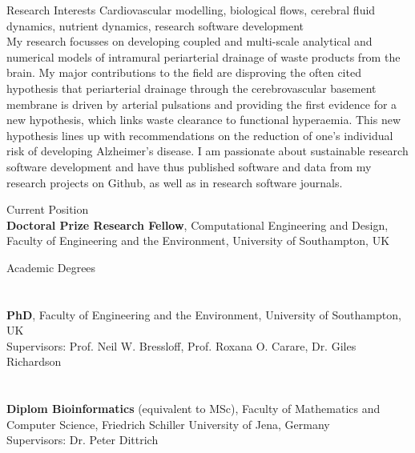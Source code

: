 \documentclass[margin,line,10pt]{res}
\begin{document}

\address{alexandra.diem@gmail.com, \url{https://www.akdiem.com}, \url{https://github.com/akdiem}}

\begin{resume}

{\sc Research Interests} Cardiovascular modelling, biological flows, cerebral fluid dynamics, nutrient dynamics, research software development\\

My research focusses on developing coupled and multi-scale analytical and numerical models of intramural periarterial drainage of waste products from the brain. My major contributions to the field are disproving the often cited hypothesis that periarterial drainage through the cerebrovascular basement membrane is driven by arterial pulsations and providing the first evidence for a new hypothesis, which links waste clearance to functional hyperaemia. This new hypothesis lines up with recommendations on the reduction of one's individual risk of developing Alzheimer's disease. I am passionate about sustainable research software development and have thus published software and data from my research projects on Github, as well as in research software journals.\\ 
  
\vspace*{-.2in}

{\sc Current Position}\\
{\bf Doctoral Prize Research Fellow}, Computational Engineering and Design, Faculty of Engineering and the Environment, University of Southampton, UK\\

\vspace*{-.2in}

{\sc Academic Degrees}\\
\vspace*{-.35in}
\section{}{\bf PhD}, Faculty of Engineering and the Environment, University of Southampton, UK\\
Supervisors: Prof. Neil W. Bressloff, Prof. Roxana O. Carare, Dr. Giles Richardson\\
\vspace*{-.35in}
\section{}{\bf Diplom Bioinformatics} (equivalent to MSc), Faculty of Mathematics and Computer Science, Friedrich Schiller University of Jena, Germany\\
Supervisors: Dr. Peter Dittrich\\


\end{resume}
\end{document}
